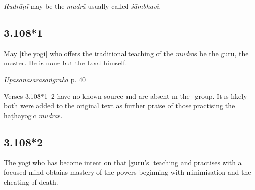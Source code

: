 \begin{ekdosis}


\begin{philcomm}[hp03_108]
\emph{Rudrāṇī} may be the \emph{mudrā} usually called \emph{śāmbhavī}.

\end{philcomm}


\subsection*{3.108*1}
\begin{translation}[hp03_108_1]
May [the yogi] who offers the traditional teaching of the \emph{mudrā}s be the guru, the master. He is none but the Lord himself.
\end{translation}


\begin{testimonia}[hp03_108_1]
\emph{Upāsanāsārasaṅgraha} p. 40 %
\begin{versinnote}
\end{versinnote}
\end{testimonia}

\begin{philcomm}[hp03_108_1]
Verses 3.108*1–2 have no known source and are absent in the \textalpha\ group. It is likely both were added to the original text as further praise of those practising the haṭhayogic \emph{mudrā}s.
\end{philcomm}


\subsection*{3.108*2}
\begin{translation}[hp03_108_2]
The yogi who has become intent on that [guru's] teaching and practises with a focused mind obtains mastery of the powers beginning with minimisation and the cheating of death.
\end{translation}


\end{ekdosis}

